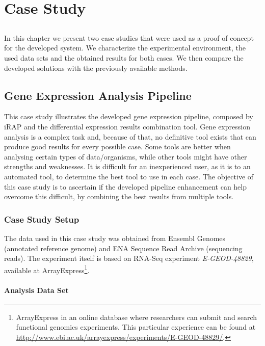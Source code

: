 \chapter{Case Study} \label{chap:casestudy}

\section*{}

In this chapter we present two case studies that were used as a proof of concept
for the developed system. We characterize the experimental environment, the used
data sets and the obtained results for both cases. We then compare the developed
solutions with the previously available methods.

\section{Gene Expression Analysis Pipeline}

This case study illustrates the developed gene expression pipeline, composed by
iRAP and the differential expression results combination tool. Gene expression
analysis is a complex task and, because of that, no definitive tool exists that
can produce good results for every possible case. Some tools are better when
analysing certain types of data/organisms, while other tools might have other
strengths and weaknesses. It is difficult for an inexperienced user, as it is to
an automated tool, to determine the best tool to use in each case. The objective
of this case study is to ascertain if the developed pipeline enhancement can
help overcome this difficult, by combining the best results from multiple tools.

\subsection{Case Study Setup}

The data used in this case study was obtained from Ensembl Genomes (annotated
reference genome) and ENA Sequence Read Archive (sequencing reads). The
experiment itself is based on RNA-Seq experiment
\emph{E-GEOD-48829},
available at ArrayExpress\footnote{ArrayExpress in an online database where
researchers can submit and search functional genomics experiments. This
particular experience can be found at \url{http://www.ebi.ac.uk/arrayexpress/experiments/E-GEOD-48829/}.}.

\subsubsection*{Analysis Data Set}

